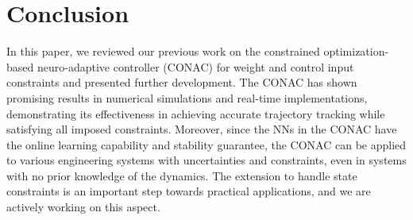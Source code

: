 \documentclass[conference]{IEEEtran}
\newcommand*{\template}{template}
\begin{document}
\section{Conclusion} 

In this paper, we reviewed our previous work on the constrained optimization-based neuro-adaptive controller (CONAC) for weight and control input constraints and presented further development.
The CONAC has shown promising results in numerical simulations and real-time implementations, demonstrating its effectiveness in achieving accurate trajectory tracking while satisfying all imposed constraints.
Moreover, since the NNs in the CONAC have the online learning capability and stability guarantee, the CONAC can be applied to various engineering systems with uncertainties and constraints, even in systems with no prior knowledge of the dynamics.
The extension to handle state constraints is an important step towards practical applications, and we are actively working on this aspect.

\addtolength{\textheight}{-12cm}   %













    
    
\end{document}

